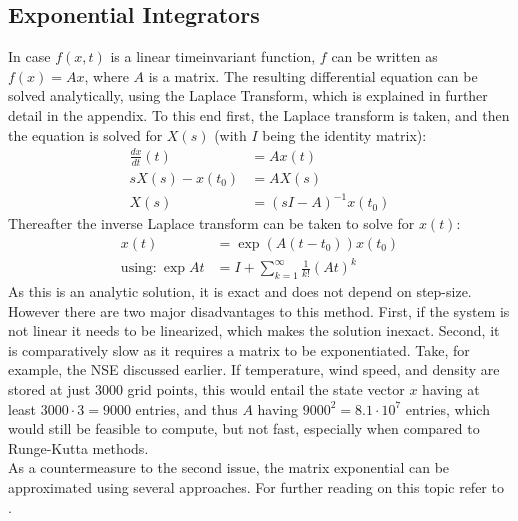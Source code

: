 \subsection{Exponential Integrators}
In case $f(x,t)$ is a linear timeinvariant function, $f$ can be written as $f(x)=Ax$, where $A$ is a matrix.
The resulting differential equation can be solved analytically, using the Laplace Transform, which is explained in further detail in the appendix.
To this end first, the Laplace transform is taken, and then the equation is solved for $X(s)$ (with $I$ being the identity matrix):
\begin{align*}
\frac{dx}{dt}(t) &= Ax(t)\\ 
sX(s) - x(t_0) &= AX(s)\\
X(s) &= (sI-A)^{-1}x(t_0)
\end{align*}
Thereafter the inverse Laplace transform can be taken to solve for $x(t)$:
\begin{align*}
x(t) &= \exp (A (t-t_0))x(t_0)\\
\text{using:}~ \exp{At} &= I + \sum_{k=1}^{\infty}\frac{1}{k!}(At)^k
\end{align*}
As this is an analytic solution, it is exact and does not depend on step-size.
However there are two major disadvantages to this method.
First, if the system is not linear it needs to be linearized, which makes the solution inexact.
Second, it is comparatively slow as it requires a matrix to be exponentiated.
Take, for example, the NSE discussed earlier.
If temperature, wind speed, and density are stored at just 3000 grid points, this would entail the state vector $x$ having at least $3000\cdot 3=9000$ entries, and thus $A$ having $9000^2=8.1\cdot 10^7$ entries, which would still be feasible to compute, but not fast, especially when compared to Runge-Kutta methods.\\
As a countermeasure to the second issue, the matrix exponential can be approximated using several approaches.
For further reading on this topic refer to \cite{moler2003nineteen}.


